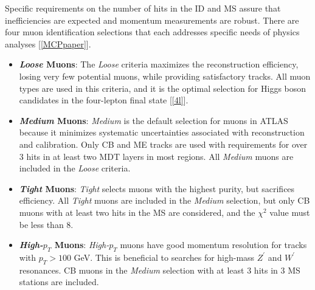 Specific requirements on the number of hits in the ID and MS assure that inefficiencies are expected and momentum measurements are robust. There are four muon identification selections that each addresses specific needs of physics analyses [\ref{MCPpaper}].

\begin{itemize}
\item \textbf{\textit{Loose} Muons}: The \textit{Loose} criteria maximizes the reconstruction efficiency, losing very few potential muons, while providing satisfactory tracks. All muon types are used in this criteria, and it is the optimal selection for Higgs boson candidates in the four-lepton final state [\ref{4l}].
\item \textbf{\textit{Medium} Muons}: \textit{Medium} is the default selection for muons in ATLAS because it minimizes systematic uncertainties associated with reconstruction and calibration. Only CB and ME tracks are used with requirements for over 3 hits in at least two MDT layers in most regions. All \textit{Medium} muons are included in the \textit{Loose} criteria.
\item \textbf{\textit{Tight} Muons}: \textit{Tight} selects muons with the highest purity, but sacrifices efficiency. All \textit{Tight} muons are included in the \textit{Medium} selection, but only CB muons with at least two hits in the MS are considered, and the $\chi^2$ value must be less than $8$.  
\item \textbf{\textit{High-$p_T$} Muons}: \textit{High-$p_T$} muons have good momentum resolution for tracks with $p_T > 100$ GeV. This is beneficial to searches for high-mass $Z^\prime$ and $W^\prime$ resonances. CB muons in the \textit{Medium} selection with at least $3$ hits in $3$ MS stations are included. 
\end{itemize}

